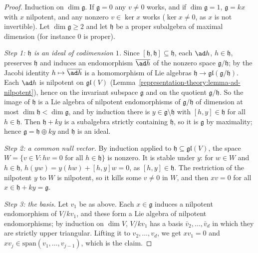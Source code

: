 \begin{proof}
Induction on $\dim\mathfrak{g}$. If $\mathfrak{g} = 0$ any $v \neq 0$ works, and if $\dim\mathfrak{g} = 1$, $\mathfrak{g} = kx$ with $x$ nilpotent, and any nonzero
$v \in \ker x$ works ($\ker x \neq 0$, as $x$ is not invertible). Let $\dim\mathfrak{g} \geq 2$ and let $\mathfrak{h}$ be a proper subalgebra of maximal dimension
(for instance $0$ is proper).

\emph{Step 1: $\mathfrak{h}$ is an ideal of codimension $1$.} Since $[\mathfrak{h}, \mathfrak{h}] \subseteq \mathfrak{h}$, each $\ad h$, $h \in \mathfrak{h}$, preserves
$\mathfrak{h}$ and induces an endomorphism $\overline{\ad h}$ of the nonzero space $\mathfrak{g}/\mathfrak{h}$; by the Jacobi identity $h \mapsto \overline{\ad h}$ is a
homomorphism of Lie algebras $\mathfrak{h} \to \mathfrak{gl}(\mathfrak{g}/\mathfrak{h})$. Each $\ad h$ is nilpotent on $\mathfrak{gl}(V)$
(Lemma~\ref{representation-theory:lemma-ad-nilpotent}), hence on the invariant subspace $\mathfrak{g}$ and on the quotient $\mathfrak{g}/\mathfrak{h}$. So the image of
$\mathfrak{h}$ is a Lie algebra of nilpotent endomorphisms of $\mathfrak{g}/\mathfrak{h}$ of dimension at most $\dim\mathfrak{h} < \dim\mathfrak{g}$, and by induction
there is $y \in \mathfrak{g} \setminus \mathfrak{h}$ with $[h, y] \in \mathfrak{h}$ for all $h \in \mathfrak{h}$. Then $\mathfrak{h} + ky$ is a subalgebra strictly
containing $\mathfrak{h}$, so it is $\mathfrak{g}$ by maximality; hence $\mathfrak{g} = \mathfrak{h} \oplus ky$ and $\mathfrak{h}$ is an ideal.

\emph{Step 2: a common null vector.} By induction applied to $\mathfrak{h} \subseteq \mathfrak{gl}(V)$, the space $W = \{v \in V : hv = 0 \text{ for all } h \in \mathfrak{h}\}$
is nonzero. It is stable under $y$: for $w \in W$ and $h \in \mathfrak{h}$, $h(yw) = y(hw) + [h, y]w = 0$, as $[h, y] \in \mathfrak{h}$. The restriction of the nilpotent
$y$ to $W$ is nilpotent, so it kills some $v \neq 0$ in $W$, and then $xv = 0$ for all $x \in \mathfrak{h} + ky = \mathfrak{g}$.

\emph{Step 3: the basis.} Let $v_1$ be as above. Each $x \in \mathfrak{g}$ induces a nilpotent endomorphism of $V/kv_1$, and these form a Lie algebra of nilpotent
endomorphisms; by induction on $\dim V$, $V/kv_1$ has a basis $\bar v_2, \ldots, \bar v_d$ in which they are strictly upper triangular. Lifting it to $v_2, \ldots, v_d$,
we get $xv_1 = 0$ and $xv_j \in \mathrm{span}(v_1, \ldots, v_{j-1})$, which is the claim.
\end{proof}

